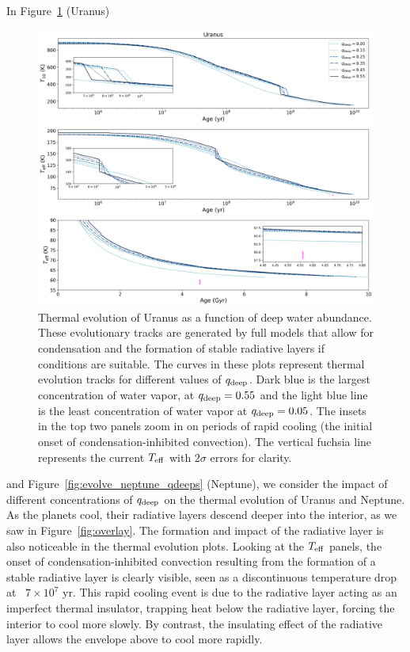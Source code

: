 \documentclass[11pt]{ucscthesisbs}
\begin{document}
In Figure~\ref{fig:evolve_uranus_qdeeps} (Uranus) 
\begin{figure}[h]
 \centerline{
  \includegraphics[width=\columnwidth]{figures/u_cooling_curves_nz_4096_more_qdeeps.png}
 }
\caption[Thermal Evolution Curves for Uranus - Water Vapor Concentration Comparisons]
{Thermal evolution of Uranus as a function of deep water abundance. These evolutionary tracks are generated by full models that allow for condensation and the formation of stable radiative layers if conditions are suitable. The curves in these plots represent thermal evolution tracks for different values of $q_{\rm deep}$. Dark blue is the largest concentration of water vapor, at $q_{\rm deep} = 0.55$ and the light blue line is the least concentration of water vapor at $q_{\rm deep} = 0.05$. The insets in the top two panels zoom in on periods of rapid cooling (the initial onset of condensation-inhibited convection). The vertical fuchsia line represents the current $T_{\rm eff}$ with $2\sigma$ errors for clarity.}
\label{fig:evolve_uranus_qdeeps}
\end{figure}
and Figure~\ref{fig:evolve_neptune_qdeeps} (Neptune), we consider the impact of different concentrations of $q_{\rm deep}$ on the thermal evolution of Uranus and Neptune. As the planets cool, their radiative layers descend deeper into the interior, as we saw in Figure~\ref{fig:overlay}. The formation and impact of the radiative layer is also noticeable in the thermal evolution plots. Looking at the $T_{\rm eff}$ panels, the onset of condensation-inhibited convection resulting from the formation of a stable radiative layer is clearly visible, seen as a discontinuous temperature drop at ~$7 \times 10^7$ yr. This rapid cooling event is due to the radiative layer acting as an imperfect thermal insulator, trapping heat below the radiative layer, forcing the interior to cool more slowly. By contrast, the insulating effect of the radiative layer allows the envelope above to cool more rapidly. 
\end{document}
